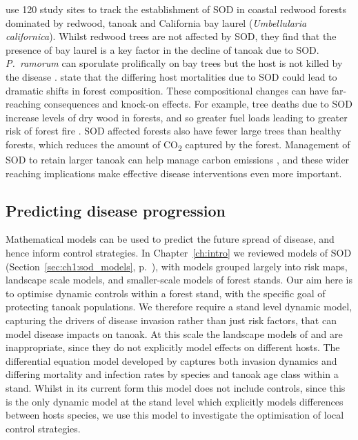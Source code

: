\citet{maloney_establishment_2005} use 120 study sites to track the establishment of SOD in coastal redwood forests dominated by redwood, tanoak and California bay laurel (\textit{Umbellularia californica}). Whilst redwood trees are not affected by SOD, they find that the presence of bay laurel is a key factor in the decline of tanoak due to SOD\@. \textit{P.~ramorum} can sporulate prolifically on bay trees but the host is not killed by the disease \citep{davidson_sources_2008}. \citet{maloney_establishment_2005} state that the differing host mortalities due to SOD could lead to dramatic shifts in forest composition. These compositional changes can have far-reaching consequences and knock-on effects. For example, tree deaths due to SOD increase levels of dry wood in forests, and so greater fuel loads leading to greater risk of forest fire \citep{forrestel_disease_2015}. SOD affected forests also have fewer large trees than healthy forests, which reduces the amount of CO\textsubscript{2} captured by the forest. Management of SOD to retain larger tanoak can help manage carbon emissions \citep{twieg_reducing_2017}, and these wider reaching implications make effective disease interventions even more important.

\subsection{Predicting disease progression\label{sec:ch5:sod_models}}

Mathematical models can be used to predict the future spread of disease, and hence inform control strategies. In Chapter~\ref{ch:intro} we reviewed models of SOD (Section~\ref{sec:ch1:sod_models}, p.~\pageref{sec:ch1:sod_models}), with models grouped largely into risk maps, landscape scale models, and smaller-scale models of forest stands. Our aim here is to optimise dynamic controls within a forest stand, with the specific goal of protecting tanoak populations. We therefore require a stand level dynamic model, capturing the drivers of disease invasion rather than just risk factors, that can model disease impacts on tanoak. At this scale the landscape models of \citet{meentemeyer_epidemiological_2011} and \citet{tonini_modeling_2018} are inappropriate, since they do not explicitly model effects on different hosts. The differential equation model developed by \citet{cobb_ecosystem_2012} captures both invasion dynamics and differing mortality and infection rates by species and tanoak age class within a stand. Whilst in its current form this model does not include controls, since this is the only dynamic model at the stand level which explicitly models differences between hosts species, we use this model to investigate the optimisation of local control strategies.


